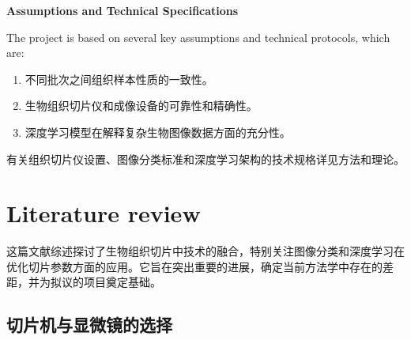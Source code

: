 \textbf{Assumptions and Technical Specifications}

The project is based on several key assumptions and technical protocols, which are:


\begin{enumerate}
    \item 不同批次之间组织样本性质的一致性。
    \item 生物组织切片仪和成像设备的可靠性和精确性。
    \item 深度学习模型在解释复杂生物图像数据方面的充分性。
\end{enumerate}
有关组织切片仪设置、图像分类标准和深度学习架构的技术规格详见方法和理论。

\section{Literature review}


这篇文献综述探讨了生物组织切片中技术的融合，特别关注图像分类和深度学习在优化切片参数方面的应用。它旨在突出重要的进展，确定当前方法学中存在的差距，并为拟议的项目奠定基础。
\subsection{切片机与显微镜的选择}


